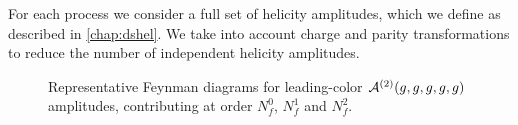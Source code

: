 For each process we consider a full set of helicity amplitudes, which we 
define as described in \cref{chap:dshel}.
We take into account charge and parity transformations to reduce
the number of independent helicity amplitudes.

\begin{figure}[ht]
  \begin{center}
\end{center} 
\caption{Representative Feynman diagrams for leading-color
$\mathcal{A}^{(2)}(g,g,g,g,g)$ amplitudes, contributing at order
$N_f^0$, $N_f^1$ and $N_f^2$.}
\label{fig_parents5g}
\end{figure}

